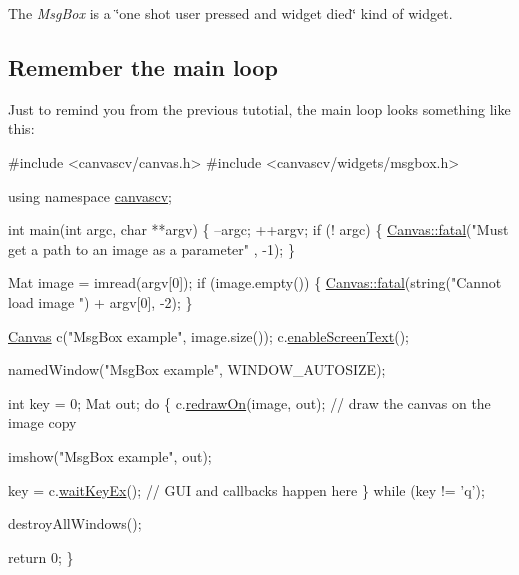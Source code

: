 The {\itshape Msg\+Box} is a \char`\"{}one shot user pressed and widget died\char`\"{} kind of widget.\hypertarget{tutmsgbox_msgbox_s1}{}\subsection{Remember the main loop}\label{tutmsgbox_msgbox_s1}
Just to remind you from the previous tutotial, the main loop looks something like this\+: 
\begin{DoxyCode}
\textcolor{preprocessor}{#include <canvascv/canvas.h>}
\textcolor{preprocessor}{#include <canvascv/widgets/msgbox.h>}

\textcolor{keyword}{using namespace }\hyperlink{namespacecanvascv}{canvascv};

\textcolor{keywordtype}{int} main(\textcolor{keywordtype}{int} argc, \textcolor{keywordtype}{char} **argv)
\{
    --argc;
    ++argv;
    \textcolor{keywordflow}{if} (! argc)
    \{
        \hyperlink{classcanvascv_1_1Canvas_add93c0d5cc1e9b49f97510952a8a1961}{Canvas::fatal}(\textcolor{stringliteral}{"Must get a path to an image as a parameter"} , -1);
    \}

    Mat image = imread(argv[0]);
    \textcolor{keywordflow}{if} (image.empty())
    \{
        \hyperlink{classcanvascv_1_1Canvas_add93c0d5cc1e9b49f97510952a8a1961}{Canvas::fatal}(\textcolor{keywordtype}{string}(\textcolor{stringliteral}{"Cannot load image "}) + argv[0], -2);
    \}

    \hyperlink{classcanvascv_1_1Canvas}{Canvas} c(\textcolor{stringliteral}{"MsgBox example"}, image.size());
    c.\hyperlink{classcanvascv_1_1Canvas_ae68d3277e738d349232400b38f0e5f9e}{enableScreenText}();

    namedWindow(\textcolor{stringliteral}{"MsgBox example"}, WINDOW\_AUTOSIZE);

    \textcolor{keywordtype}{int} key = 0;
    Mat out;
    \textcolor{keywordflow}{do}
    \{
        c.\hyperlink{classcanvascv_1_1Canvas_a018c66e277de7904b8146ea3f3feebdd}{redrawOn}(image, out);  \textcolor{comment}{// draw the canvas on the image copy}

        imshow(\textcolor{stringliteral}{"MsgBox example"}, out);

        key = c.\hyperlink{classcanvascv_1_1Canvas_a59397db05f5d9e45264f626f6a2ae528}{waitKeyEx}(); \textcolor{comment}{// GUI and callbacks happen here}
    \} \textcolor{keywordflow}{while} (key != \textcolor{charliteral}{'q'});

    destroyAllWindows();

    \textcolor{keywordflow}{return} 0;
\}
\end{DoxyCode}


